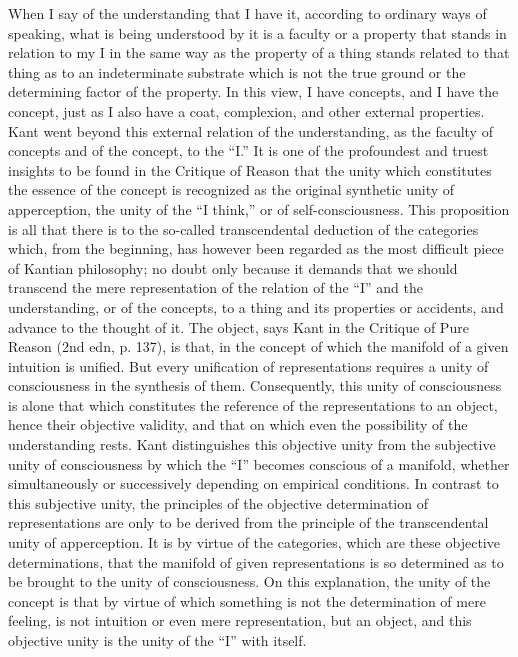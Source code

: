 When I say of the understanding that I have it,
according to ordinary ways of speaking,
what is being understood by it is
a faculty or a property that
stands in relation to my I
in the same way as the property of a thing
stands related to that thing
as to an indeterminate substrate
which is not the true ground
or the determining factor of the property.
In this view, I have concepts, and I have the concept,
just as I also have a coat, complexion,
and other external properties.
Kant went beyond this external relation
of the understanding,
as the faculty of concepts and of the concept,
to the “I.”
It is one of the profoundest and truest insights
to be found in the Critique of Reason
that the unity which constitutes
the essence of the concept is recognized
as the original synthetic unity of apperception,
the unity of the “I think,” or of self-consciousness.
This proposition is all that there is to the so-called
transcendental deduction of the categories
which, from the beginning, has however been regarded
as the most difficult piece of Kantian philosophy;
no doubt only because it demands that we should transcend
the mere representation of the relation
of the “I” and the understanding, or of the concepts,
to a thing and its properties or accidents,
and advance to the thought of it.
The object, says Kant in the Critique of
Pure Reason (2nd edn, p. 137), is that,
in the concept of which the manifold
of a given intuition is unified.
But every unification of representations
requires a unity of consciousness in the synthesis of them.
Consequently, this unity of consciousness is
alone that which constitutes the reference
of the representations to an object,
hence their objective validity,
and that on which even the possibility of the understanding rests.
Kant distinguishes this objective unity from
the subjective unity of consciousness
by which the “I” becomes conscious of a manifold,
whether simultaneously or successively
depending on empirical conditions.
In contrast to this subjective unity,
the principles of the objective determination
of representations are only to be derived
from the principle of the transcendental unity of apperception.
It is by virtue of the categories,
which are these objective determinations,
that the manifold of given representations is
so determined as to be brought
to the unity of consciousness.
On this explanation,
the unity of the concept is that by virtue of which
something is not the determination of mere feeling,
is not intuition or even mere representation, but an object,
and this objective unity is the unity of the “I” with itself.
